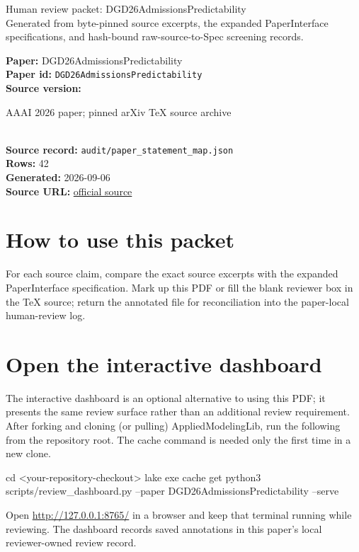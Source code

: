 \documentclass[10pt]{article}
\begin{document}
\fontsize{9}{10}\selectfont

\begin{center}
{\LARGE Human review packet: DGD26AdmissionsPredictability}\\[0.35em]
\small Generated from byte-pinned source excerpts, the expanded PaperInterface
specifications, and hash-bound raw-source-to-Spec screening records.
\end{center}

\noindent\textbf{Paper:} DGD26AdmissionsPredictability\\
\textbf{Paper id:} \texttt{DGD26AdmissionsPredictability}\\
\textbf{Source version:} \parbox[t]{0.76\linewidth}{\raggedright AAAI 2026 paper; pinned arXiv TeX source archive}\\
\textbf{Source record:} \texttt{audit/paper\_statement\_map.json}\\
\textbf{Rows:} 42\\
\textbf{Generated:} 2026-09-06\\
\textbf{Source URL:} \href{https://ojs.aaai.org/index.php/AAAI/article/view/41179}{official source}





\section*{How to use this packet}
For each source claim, compare the exact source excerpts with the expanded
PaperInterface specification. Mark up this PDF or fill the blank reviewer box in the TeX source;
return the annotated file for reconciliation into the paper-local human-review
log.

\section*{Open the interactive dashboard}
The interactive dashboard is an optional alternative to using this PDF; it
presents the same review surface rather than an additional review requirement.
After forking and cloning (or pulling) AppliedModelingLib, run the following from the
repository root. The cache command is needed only the first time in a new clone.
\begin{ReviewVerbatim}
cd <your-repository-checkout>
lake exe cache get
python3 scripts/review_dashboard.py --paper DGD26AdmissionsPredictability --serve
\end{ReviewVerbatim}
Open \url{http://127.0.0.1:8765/} in a browser and keep that terminal running
while reviewing. The dashboard records saved annotations in this paper's local
reviewer-owned review record.
\end{document}
